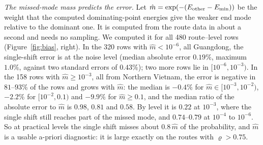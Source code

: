 \documentclass[11pt]{article}
\theoremstyle{definition}
\theoremstyle{remark}
\begin{document}
\emph{The missed-mode mass predicts the error.} Let
$\hat m=\exp(-(E_{\rm other}-E_{\min}))$ be the weight that the computed
dominating-point energies give the weaker end mode relative to the dominant
one. It is computed from the route data in about a second and needs no
sampling. We computed it for all 480 route--level rows
(Figure~\ref{fig:bias}, right). In the 320 rows with $\hat m<10^{-6}$, all
Guangdong, the single-shift error is at the noise level (median absolute error
$0.19\%$, maximum $1.0\%$, against two standard errors of $0.43\%$); two more
rows lie in $[10^{-6},10^{-3})$.
In the 158 rows with $\hat m\ge10^{-3}$, all from Northern Vietnam, the error
is negative in $81$--$93\%$ of the rows and grows with $\hat m$: the median is
$-0.4\%$ for $\hat m\in[10^{-3},10^{-2})$, $-2.2\%$ for $[10^{-2},0.1)$ and
$-9.9\%$ for $\hat m\ge0.1$, and the median ratio of the absolute error to
$\hat m$ is $0.98$, $0.81$ and $0.58$. By level it is $0.22$ at $10^{-3}$, where
the single shift still reaches part of the missed mode, and $0.74$--$0.79$ at
$10^{-4}$ to $10^{-6}$. So at practical levels the single shift misses
about $0.8\,\hat m$ of the probability, and $\hat m$ is a usable
a-priori diagnostic: it is large exactly on the routes with $\varrho>0.75$.
\end{document}
